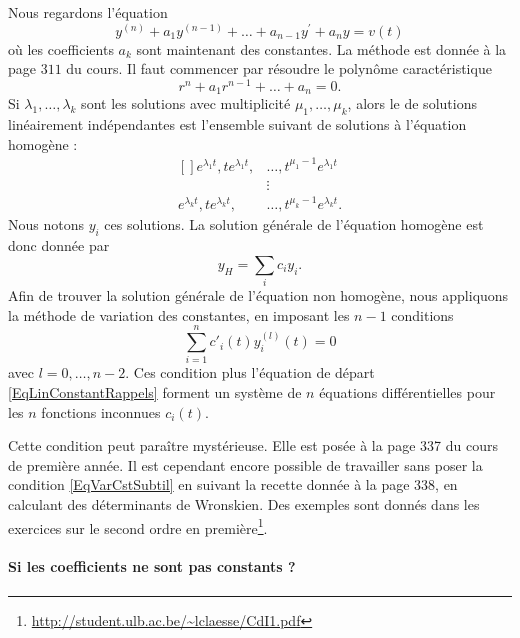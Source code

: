 Nous regardons l'équation
\begin{equation}	\label{EqLinConstantRappels}
	y^{(n)} + a_1 y^{(n-1)} + \ldots + a_{n-1} y^\prime + a_n y = v(t)
\end{equation}
où les coefficients $a_k$ sont maintenant des constantes. La méthode est donnée à la page $311$ du cours. Il faut commencer par résoudre le polynôme caractéristique
\begin{equation}
	r^n+a_1 r^{n-1}+\ldots +a_n=0.
\end{equation}
Si $\lambda_1,\ldots,\lambda_k$ sont les solutions avec multiplicité $\mu_1,\ldots,\mu_k$, alors le  de solutions linéairement indépendantes est l'ensemble suivant de solutions à l'équation homogène :
\begin{equation}
	\begin{aligned}[]
		 e^{\lambda_1 t},t e^{\lambda_1 t},	&	\ldots,t^{\mu_1-1} e^{\lambda_1  t}\\
							&\vdots\\
		 e^{\lambda_k t},t e^{\lambda_k t},	&\ldots,t^{\mu_k-1} e^{\lambda_k  t}.
	\end{aligned}
\end{equation}
Nous notons $y_i$ ces solutions. La solution générale de l'équation homogène est donc donnée par
\begin{equation}
	y_H=\sum_i c_i y_i.
\end{equation}
Afin de trouver la solution générale de l'équation non homogène, nous appliquons la méthode de variation des constantes, en imposant les $n-1$ conditions
\begin{equation}		\label{EqVarCstSubtil}
	\sum_{i=1}^n c'_i(t)y_i^{(l)}(t)=0
\end{equation}
avec $l=0,\ldots,n-2$. Ces condition plus l'équation de départ \eqref{EqLinConstantRappels} forment un système de $n$ équations différentielles pour les $n$ fonctions inconnues $c_i(t)$.

Cette condition peut paraître mystérieuse. Elle est posée à la page 337 du cours de première année. Il est cependant encore possible de travailler sans poser la condition \eqref{EqVarCstSubtil} en suivant la recette donnée à la page 338, en calculant des déterminants de Wronskien. Des exemples sont donnés dans les exercices sur le second ordre en première\footnote{\url{http://student.ulb.ac.be/~lclaesse/CdI1.pdf}}.

\paragraph{Si les coefficients ne sont pas constants ?}

